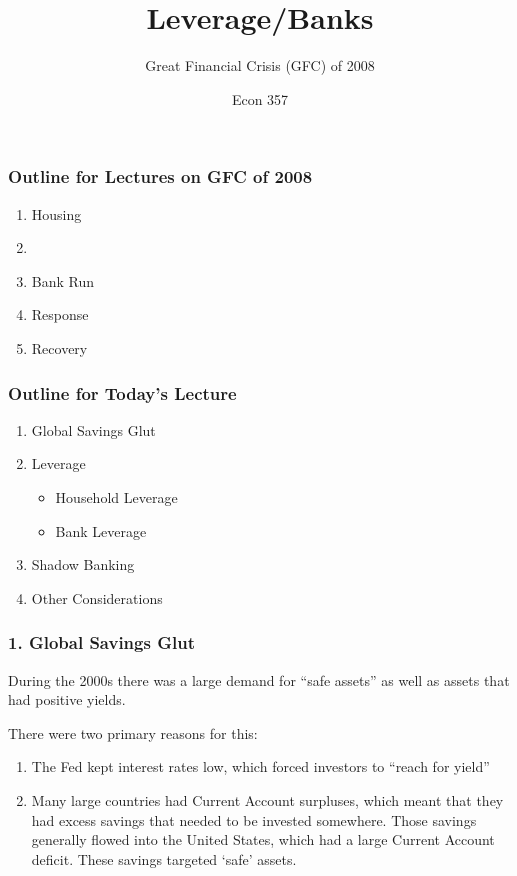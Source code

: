 \documentclass{beamer}
\title{Leverage/Banks}
\subtitle{Great Financial Crisis (GFC) of 2008}
\author{Econ 357}
\date{\week}
\begin{document}
\frame{\titlepage}

\begin{frame}
    \frametitle{Outline for Lectures on GFC of 2008}

    \begin{enumerate}
        \item Housing
        \item {}
        \item Bank Run
        \item Response
        \item Recovery
    \end{enumerate}
    \vspace{1em}

\end{frame}

\begin{frame}
    \frametitle{Outline for Today's Lecture}
    
\begin{enumerate}
    \item Global Savings Glut
    \item Leverage
    \begin{itemize}
        \item Household Leverage
        \item Bank Leverage
    \end{itemize}
    \item Shadow Banking
    \item Other Considerations
\end{enumerate}

\end{frame}

\begin{frame}[t]
    \frametitle{1. Global Savings Glut}

    During the 2000s there was a large demand for “safe assets” as well as assets that had positive yields.   
    \vspace{1em}
    
    There were two primary reasons for this:
    \begin{enumerate}
        \item The Fed kept interest rates low, which forced investors to “reach for yield”
        \item Many large countries had Current Account surpluses, which meant that they had excess savings that needed to be invested somewhere.   Those savings generally flowed into the United States, which had a large Current Account deficit.   These savings targeted ‘safe’ assets.
    \end{enumerate}

\end{frame}
\end{document}
